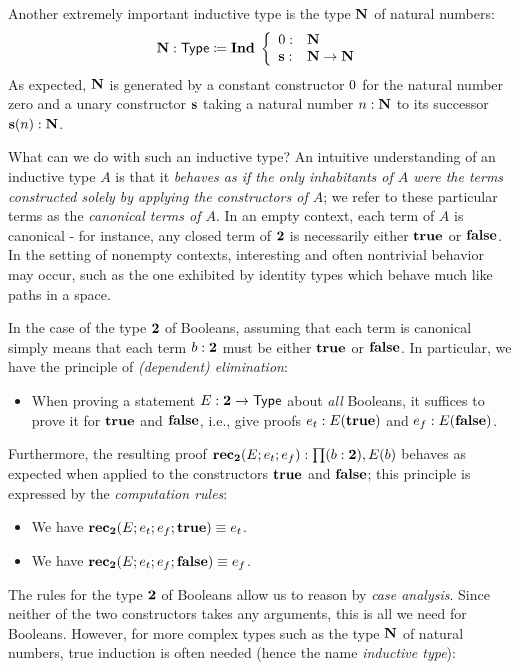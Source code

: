 Another extremely important inductive type is the type $\mathbf{N}$ of natural numbers:  
\[  \mathbf{N} : \mathsf{Type} \coloneqq \mathbf{Ind \;} \left\{ 
\begin{array}{ll}
0 : & \mathbf{N} \\
\mathbf{s} : & \mathbf{N} \to \mathbf{N}
\end{array}
\right. \]
As expected, $\mathbf{N}$ is generated by a constant constructor $0$ for the natural number zero and a unary constructor $\mathbf{s}$ taking a natural number $n : \mathbf{N}$ to its successor $\mathbf{s}(n) : \mathbf{N}$. 

What can we do with such an inductive type? An intuitive understanding of an inductive type $A$ is that it \emph{behaves as if the only inhabitants of $A$ were the terms constructed solely by applying the constructors of $A$}; we refer to these particular terms as the \emph{canonical terms of $A$}. In an empty context,
each term of $A$ is canonical - for instance, any closed term of $\mathbf{2}$ is necessarily either $\mathbf{true}$ or $\mathbf{false}$. In the setting of nonempty contexts,  
interesting and often nontrivial behavior may occur, such as the one exhibited by identity types which behave much like paths in a space.

In the case of the type $\mathbf{2}$ of Booleans, assuming that each term is canonical simply means that each term $b : \mathbf{2}$ must be either $\mathbf{true}$ or $\mathbf{false}$. In particular, we have the principle of \emph{(dependent) elimination}:

\begin{itemize}
\item When proving a statement $E : \mathbf{2} \to \mathsf{Type}$ about \emph{all} Booleans, it suffices to prove it for $\mathbf{true}$ and $\mathbf{false}$, i.e., give proofs
$ e_t : E(\mathbf{true})$ and $e_f : E(\mathbf{false})$.
\end{itemize}

Furthermore, the resulting proof $\rec_\two(E;e_t;e_f): \prd{b : \two}E(b)$ behaves as expected when applied to the constructors $\mathbf{true}$ and $\mathbf{false}$; this principle is expressed by the \emph{computation rules}:
\begin{itemize}
\item We have $\mathbf{rec}_\mathbf{2}(E;e_t;e_f;\mathbf{true}) \equiv e_t$.
\item We have $\mathbf{rec}_\mathbf{2}(E;e_t;e_f;\mathbf{false}) \equiv e_f$.
\end{itemize}

The rules for the type $\mathbf{2}$ of Booleans allow us to reason by \emph{case analysis}. Since neither of the two constructors takes any arguments, this is all we need for Booleans. However, for more complex types such as the type $\mathbf{N}$ of natural numbers, true induction is often needed (hence the name \emph{inductive type}):

